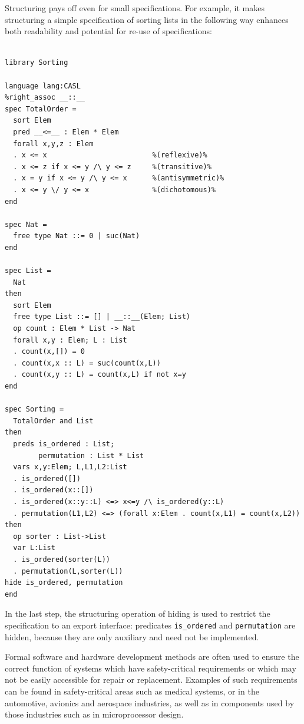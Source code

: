 \documentclass[10pt, a4paper]{isov2}
\begin{document}
Structuring pays off even for small specifications. For example, it makes
structuring a simple specification of sorting lists in the
following way enhances both readability and potential for re-use
of specifications:

\begin{lstlisting}[basicstyle=\ttfamily\footnotesize,language=dolText,alsolanguage=CASL,escapechar=@,mathescape]
%prefix( lang:  <http://purl.net/DOL/languages/> )%

library Sorting

language lang:CASL
%right_assoc __::__
spec TotalOrder =
  sort Elem
  pred __<=__ : Elem * Elem
  forall x,y,z : Elem
  . x <= x                         %(reflexive)%
  . x <= z if x <= y /\ y <= z     %(transitive)%
  . x = y if x <= y /\ y <= x      %(antisymmetric)%
  . x <= y \/ y <= x               %(dichotomous)%
end

spec Nat =
  free type Nat ::= 0 | suc(Nat)
end

spec List =
  Nat
then
  sort Elem
  free type List ::= [] | __::__(Elem; List)
  op count : Elem * List -> Nat
  forall x,y : Elem; L : List
  . count(x,[]) = 0
  . count(x,x :: L) = suc(count(x,L))
  . count(x,y :: L) = count(x,L) if not x=y
end

spec Sorting =
  TotalOrder and List
then
  preds is_ordered : List;
        permutation : List * List
  vars x,y:Elem; L,L1,L2:List
  . is_ordered([])
  . is_ordered(x::[])
  . is_ordered(x::y::L) <=> x<=y /\ is_ordered(y::L)
  . permutation(L1,L2) <=> (forall x:Elem . count(x,L1) = count(x,L2))
then
  op sorter : List->List
  var L:List
  . is_ordered(sorter(L))
  . permutation(L,sorter(L))
hide is_ordered, permutation
end
\end{lstlisting}

In the last step, the structuring operation of hiding is used to
restrict the specification to an export interface:
 predicates \texttt{is\_ordered} and \texttt{permutation} are hidden, because they
are only auxiliary and need not be implemented.



\label{spec-2}
Formal software and hardware development methods are often used to
ensure the correct function of systems which have safety-critical
requirements or which may not be easily accessible for repair or
replacement.  Examples of such requirements can be found in
safety-critical areas such as medical systems, or in the automotive,
avionics and aerospace industries, as well as in components used by
those industries such as in microprocessor design.
\end{document}

